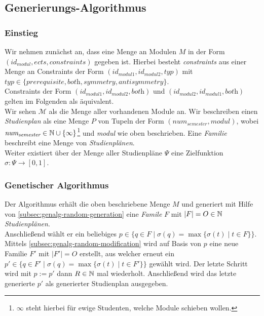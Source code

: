 \subsection{Generierungs-Algorithmus}

\newcommand{\id}[1]{\textit{id}_{#1}}
\newenvironment{nstabbing}{
	\setlength{\topsep}{-\parskip}%
	\setlength{\partopsep}{0pt}%
	\tabbing
}{\endtabbing}

\subsubsection{Einstieg}
Wir nehmen zunächst an, dass eine Menge an Modulen $M$ in der Form $(\id{\textit{modul}}, \textit{ects}, \textit{constraints})$ gegeben ist.
Hierbei besteht \textit{constraints} aus einer Menge an Constraints der Form $(\id{\textit{modul1}}, \id{\textit{modul2}}, \textit{typ})$ mit $\textit{typ} \in \{\textit{prerequisite}, \textit{both}, \textit{symmetry}, \textit{antisymmetry}\}$. \\
Constraints der Form $(\id{\textit{modul1}}, \id{\textit{modul2}}, \textit{both})$ und $(\id{\textit{modul2}}, \id{\textit{modul1}}, \textit{both})$ gelten im Folgenden als äquivalent.\\
Wir sehen $ \mathcal{M} $ als die Menge aller vorhandenen Module an.
Wir beschreiben einen \textit{Studienplan} als eine Menge $P$ von Tupeln der Form $(\textit{num}_{\textit{semester}}, \textit{modul})$, wobei $\textit{num}_{\textit{semester}} \in \mathbb{N} \cup \{\infty\}$\footnote{$\infty$ steht hierbei für ewige Studenten, welche Module schieben wollen.} und \textit{modul} wie oben beschrieben. Eine \textit{Familie} beschreibt eine Menge von \textit{Studienplänen}. \\
Weiter existiert über der Menge aller Studienpläne $\Psi$ eine Zielfunktion  $\sigma : \Psi \to [0,1]$.

\subsubsection{Genetischer Algorithmus}
Der Algorithmus erhält die oben beschriebene Menge $M$ und generiert mit Hilfe von  \ref{subsec:genalg-random-generation} eine \textit{Famile} $F$ mit $|F| = O \in \mathbb{N}$ \textit{Studienplänen}.\\
Anschließend wählt er ein beliebiges $p \in \{q \in F \mid \sigma(q)=\max \{\sigma(t) \mid t \in F \} \}$.\\
Mittels \ref{subsec:genalg-random-modification} wird auf Basis von $p$ eine neue Familie $F'$ mit $|F'| = O$ erstellt, aus welcher erneut ein $p' \in \{q \in F' \mid \sigma(q) = \max \{\sigma(t) \mid t \in F' \} \}$ gewählt wird. Der letzte Schritt wird mit $p := p'$ dann $R \in \mathbb{N}$ mal wiederholt.
Anschließend wird das letzte generierte $p'$ als generierter Studienplan ausgegeben.

